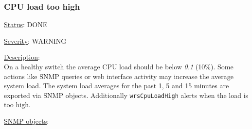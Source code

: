 \subsubsection{\bf CPU load too high}
		\label{fail:other:cpu}
		\begin{pck_descr}
			\item [] \underline{Status}: DONE
			\item [] \underline{Severity}: WARNING
			\item [] \underline{Description}:\\
				On a healthy switch the average CPU load should be below \emph{0.1} (10\%).
				Some actions like SNMP queries or web interface activity may increase
				the average system load. The system load averages for the past 1, 5 and
				15 minutes are exported via SNMP objects. Additionally
				\texttt{wrsCpuLoadHigh} alerts when the load is too high.
			\item [] \underline{SNMP objects}:\\
				{\footnotesize
				\\
				\\
				\\
				\\
				\\
				 }
		\end{pck_descr}

